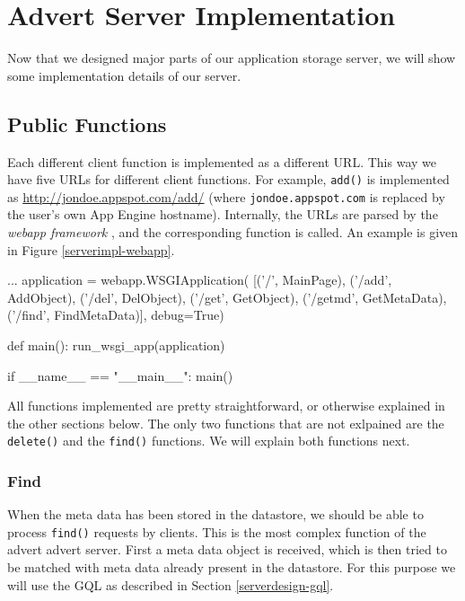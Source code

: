 \section{Advert Server Implementation}
\label{serverimpl}
Now that we designed major parts of our application storage server, we will
show some implementation details of our server.  

\subsection{Public Functions}
Each different client function is implemented as a different URL. This way we
have five URLs for different client functions. For example, \texttt{add()} is
implemented as \url{http://jondoe.appspot.com/add/} (where
\texttt{jondoe.appspot.com} is replaced by the user's own App Engine hostname).
Internally, the URLs are parsed by the \emph{webapp framework}
\cite{app-engine-webapp}, and the corresponding function is called. An example
is given in Figure \ref{serverimpl-webapp}.

\begin{figure*}[ht] %
\begin{center}
\begin{code}
...
application = webapp.WSGIApplication(
                                     [('/',      MainPage),
                                      ('/add',   AddObject),
                                      ('/del',   DelObject),
                                      ('/get',   GetObject),
                                      ('/getmd', GetMetaData),
                                      ('/find',  FindMetaData)],
                                     debug=True)

def main():
  run_wsgi_app(application)

if __name__ == "__main__":
  main()
\end{code}
\caption{An Example of the webapp Framework.\label{serverimpl-webapp}}
\end{center}
\end{figure*}

All functions implemented are pretty straightforward, or otherwise
explained in the other sections below. The only two functions that are not
exlpained are the \texttt{delete()} and the \texttt{find()} functions. We will
explain both functions next.

\subsubsection{Find}
\label{serverimpl-find}
When the meta data has been stored in the datastore, we should be able to process
\texttt{find()} requests by clients. This is the most complex function of the
advert advert server. First a meta data object is received, which is then tried
to be matched with meta data already present in the datastore. For this purpose
we will use the GQL as described in Section \ref{serverdesign-gql}.

